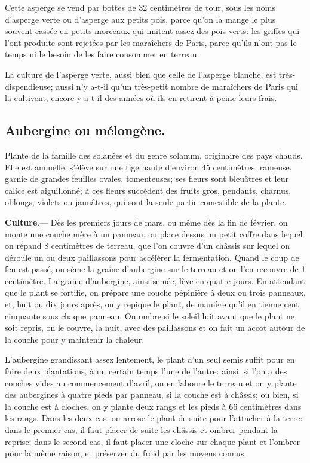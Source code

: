 \documentclass[10pt,a4paper]{book}
\begin{document}
Cette asperge se vend par bottes de 32 centimètres de tour, sous les noms d'asperge verte ou d'asperge aux petits pois, parce qu'on la mange le plus souvent cassée en petits morceaux qui imitent assez des pois verts: les griffes qui l'ont produite sont rejetées par les maraîchers de Paris, parce qu'ils n'ont pas le temps ni le besoin de les faire consommer en terreau.

La culture de l'asperge verte, aussi bien que celle de l'asperge blanche, est très-dispendieuse; aussi n'y a-t-il qu'un très-petit nombre de maraîchers de Paris qui la cultivent, encore y a-t-il des années où ils en retirent à peine leurs frais.

\subsection{Aubergine ou mélongène.}

Plante de la famille des solanées et du genre solanum, originaire des pays chauds. Elle est annuelle, s'élève sur une tige haute d'environ 45 centimètres, rameuse, garnie de grandes feuilles ovales, tomenteuses; ses fleurs sont bleuâtres et leur calice est aiguillonné; à ces fleurs succèdent des fruits gros, pendants, charnus, oblongs, violets ou jaunâtres, qui sont la seule partie comestible de la plante.

\textbf{Culture}.--- Dès les premiers jours de mars, ou même dès la fin de février, on monte une couche mère à un panneau, on place dessus un petit coffre dans lequel on répand 8 centimètres de terreau, que l'on couvre d'un châssis sur lequel on déroule un ou deux paillassons pour accélérer la fermentation. Quand le coup de feu est passé, on sème la graine d'aubergine sur le terreau et on l'en recouvre de 1 centimètre. La graine d'aubergine, ainsi semée, lève en quatre jours. En attendant que le plant se fortifie, on prépare une couche pépinière à deux ou trois panneaux, et, huit ou dix jours après, on y repique le plant, de manière qu'il en tienne cent cinquante sous chaque panneau. On ombre si le soleil luit avant que le plant ne soit repris, on le couvre, la nuit, avec des paillassons et on fait un accot autour de la couche pour y maintenir la chaleur.

L'aubergine grandissant assez lentement, le plant d'un seul semis suffit pour en faire deux plantations, à un certain temps l'une de l'autre: ainsi, si l'on a des couches vides au commencement d'avril, on en laboure le terreau et on y plante des aubergines à quatre pieds par panneau, si la couche est à châssis; ou bien, si la couche est à cloches, on y plante deux rangs et les pieds à 66 centimètres dans les rangs. Dans les deux cas, on arrose le plant de suite pour l'attacher à la terre: dans le premier cas, il faut placer de suite les châssis et ombrer pendant la reprise; dans le second cas, il faut placer une cloche sur chaque plant et l'ombrer pour la même raison, et préserver du froid par les moyens connus.
\end{document}
